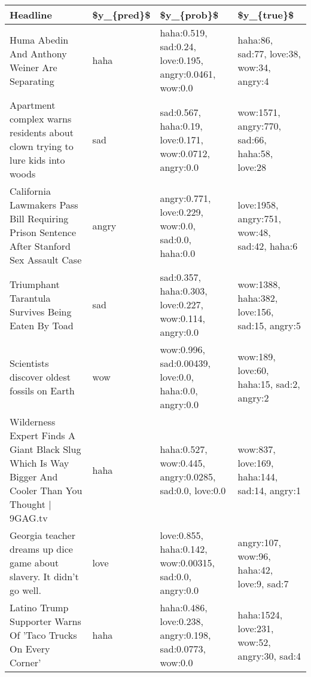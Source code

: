 \begin{tabular}{llll}
\toprule
                                                                                             Headline & \$y\_\{pred\}\$ &                                                \$y\_\{prob\}\$ &                                     \$y\_\{true\}\$ \\
\midrule
                                                        Huma Abedin And Anthony Weiner Are Separating &       haha &   haha:0.519, sad:0.24, love:0.195, angry:0.0461, wow:0.0 &      haha:86, sad:77, love:38, wow:34, angry:4 \\
                         Apartment complex warns residents about clown trying to lure kids into woods &        sad &   sad:0.567, haha:0.19, love:0.171, wow:0.0712, angry:0.0 &  wow:1571, angry:770, sad:66, haha:58, love:28 \\
             California Lawmakers Pass Bill Requiring Prison Sentence After Stanford Sex Assault Case &      angry &       angry:0.771, love:0.229, wow:0.0, sad:0.0, haha:0.0 &   love:1958, angry:751, wow:48, sad:42, haha:6 \\
                                                    Triumphant Tarantula Survives Being Eaten By Toad &        sad &   sad:0.357, haha:0.303, love:0.227, wow:0.114, angry:0.0 &  wow:1388, haha:382, love:156, sad:15, angry:5 \\
                                                          Scientists discover oldest fossils on Earth &        wow &     wow:0.996, sad:0.00439, love:0.0, haha:0.0, angry:0.0 &      wow:189, love:60, haha:15, sad:2, angry:2 \\
 Wilderness Expert Finds A Giant Black Slug Which Is Way Bigger And Cooler Than You Thought | 9GAG.tv &       haha &    haha:0.527, wow:0.445, angry:0.0285, sad:0.0, love:0.0 &   wow:837, love:169, haha:144, sad:14, angry:1 \\
                                Georgia teacher dreams up dice game about slavery. It didn't go well. &       love &   love:0.855, haha:0.142, wow:0.00315, sad:0.0, angry:0.0 &      angry:107, wow:96, haha:42, love:9, sad:7 \\
                                        Latino Trump Supporter Warns Of 'Taco Trucks On Every Corner' &       haha &  haha:0.486, love:0.238, angry:0.198, sad:0.0773, wow:0.0 &   haha:1524, love:231, wow:52, angry:30, sad:4 \\
\bottomrule
\end{tabular}
